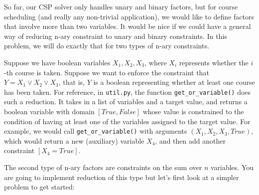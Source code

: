 \documentclass[10pt]{article}
\begin{document}
So far, our CSP solver only handles unary and binary factors, but for course scheduling (and really any non-trivial application), we would like to define factors that involve more than two variables. It would be nice if we could have a general way of reducing n-ary constraint to unary and binary constraints. In this problem, we will do exactly that for two types of n-ary constraints.
\smallskip

Suppose we have boolean variables $X_1, X_2, X_3$, where $X_i$ represents whether the $i$-th course is taken. Suppose we want to enforce the constraint that $Y = X_1 \vee X_2 \vee X_3$, that is, $Y$ is a boolean representing whether at least one course has been taken. For reference, in \texttt{util.py}, the function \texttt{get\_or\_variable()} does such a reduction. It takes in a list of variables and a target value, and returns a boolean variable with domain $[True, False]$ whose value is constrained to the condition of having at least one of the variables assigned to the target value. For example, we would call \texttt{get\_or\_variable()} with arguments $(X_1, X_2, X_3, True)$, which would return a new (auxiliary) variable $X_4$, and then add another constraint $[X_4 = True]$.
\smallskip

The second type of n-ary factors are constraints on the sum over $n$ variables. You are going to implement reduction of this type but let's first look at a simpler problem to get started:
\end{document}
